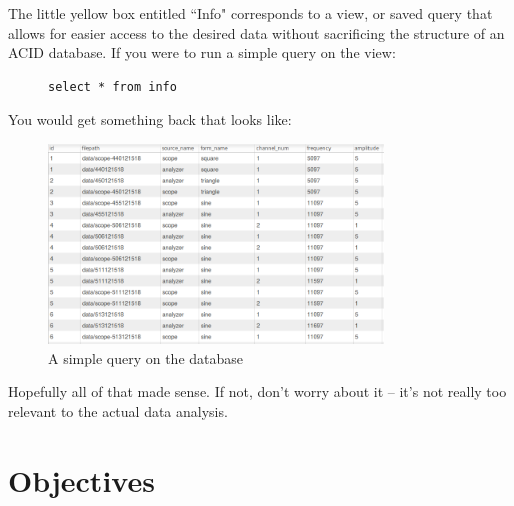 \documentclass{article}
\begin{document}
The little yellow box entitled ``Info" corresponds to a view, or saved query
that allows for easier access to the desired data without sacrificing the
structure of an ACID database. If you were to run a simple query on the view:

\begin{figure}[H]
\centering
\begin{minipage}{.4\textwidth}
\begin{tcolorbox}
\begin{verbatim}
select * from info
\end{verbatim}
\end{tcolorbox}
\end{minipage}
\end{figure}

You would get something back that looks like:
\begin{figure}[H]
\begin{minipage}{1.12\textwidth}
\begin{tcolorbox}
    \centering
        \includegraphics[width=8.9cm, height=5.3cm]{figures/figure2.png}
        \caption{A simple query on the database}
        \label{fig:fig2}
\end{tcolorbox}
\end{minipage}
\end{figure}

Hopefully all of that made sense. If not, don't worry about it -- it's not really
too relevant to the actual data analysis.
\section{Objectives}
\end{document}
